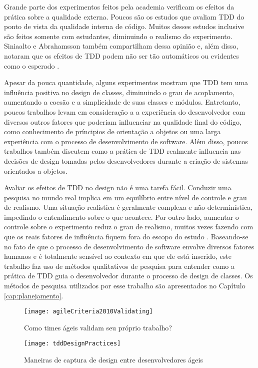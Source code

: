 Grande parte dos experimentos feitos pela academia verificam os
efeitos da prática sobre a qualidade externa. Poucos são os estudos que avaliam TDD do
ponto de vista da qualidade interna de código. Muitos desses estudos
inclusive são feitos somente com estudantes, diminuindo o realismo do experimento. 
Siniaalto e Abrahamsson também
compartilham dessa opinião e, além disso, notaram que os efeitos de TDD podem 
não ser tão automáticos ou evidentes como o esperado \cite{alarming-results}.

Apesar da pouca quantidade, alguns experimentos mostram que TDD tem uma influência
positiva no design de classes, diminuindo o grau de acoplamento, aumentando
a coesão e a simplicidade de suas classes e módulos. Entretanto, poucos trabalhos
levam em consideração a a experiência do desenvolvedor com diversos
outros fatores que poderiam influenciar na qualidade final do código, como conhecimento
de príncipios de orientação a objetos ou uma larga experiência com o processo de 
desenvolvimento de software. Além disso, poucos trabalhos também discutem como
a prática de TDD realmente influencia 
nas decisões de design tomadas pelos desenvolvedores durante a criação de sistemas 
orientados a objetos.

Avaliar os efeitos de TDD no design não é uma tarefa fácil.
Conduzir uma pesquisa no mundo real implica em um equilíbrio entre
nível de controle e grau de realismo. Uma situação realística é geralmente complexa e 
não-determinística, impedindo o entendimento sobre o que acontece. Por outro
lado, aumentar o controle sobre o experimento reduz o grau de realismo, muitos
vezes fazendo com que os reais fatores de influência fiquem fora do escopo do 
estudo \cite{guidelines-case-study}.
Baseando-se no fato de que o processo de desenvolvimento de software envolve 
diversos fatores humanos e é totalmente sensível ao contexto em que ele está 
inserido, este trabalho faz uso de métodos qualitativos de pesquisa 
para entender como a prática de TDD guia o desenvolvedor durante 
o processo de design de classes.
Os métodos de pesquisa utilizados por
esse trabalho são apresentados no Capítulo \ref{cap:planejamento}.

\begin{figure}[ht]
  \begin{minipage}[b]{0.45\linewidth}
    \centering
    \texttt{[image: agileCriteria2010Validating]}
    \caption{Como times ágeis validam seu próprio trabalho?}
    \label{fig:wambler-agile-2010}
  \end{minipage}
  \hspace{0.5cm}
  \begin{minipage}[b]{0.45\linewidth}
    \centering
    \texttt{[image: tddDesignPractices]}
    \caption{Maneiras de captura de design entre desenvolvedores ágeis}  
    \label{fig:wambler-tdd-2008}
  \end{minipage}
\end{figure}			


